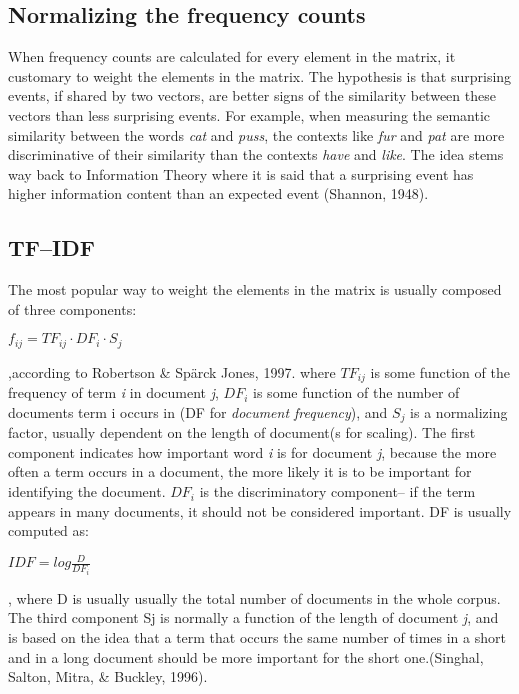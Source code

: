 \subsection{Normalizing the frequency counts}
When frequency counts are calculated for every element in the matrix, it customary to weight the elements in the matrix. The hypothesis is that surprising events, if shared by two vectors, are better signs of the similarity between these vectors than less surprising events. For example, when measuring the semantic similarity between the words \textit{cat} and \textit{puss}, the contexts like \textit{fur} and \textit{pat} are more discriminative of their similarity than the contexts \textit{have} and \textit{like}. The idea stems way back to Information Theory where it is said that a surprising event has higher information content than an expected event (Shannon, 1948)\cite{shannon1948}.
\subsection{TF--IDF}
The most popular way to weight the elements in the matrix is usually composed of three components:
\begin{center}
\large{
$f_{ij} = TF_{ij} \cdot DF_{i} \cdot S_{j}$
}
\end{center}
,according to Robertson \& Sp\"{a}rck Jones, 1997. \cite{robertson_jones1997} where $TF_{ij}$  is some function of the frequency of term \textit{i} in document \textit{j}, $DF_{i}$ is some function of the number of documents term i occurs in (DF for \textit{document frequency}), and $S_{j}$ is a normalizing factor, usually dependent on the length of document(s for scaling).
The first component indicates how important word \textit{i} is for document \textit{j}, because the more often a term occurs in a document, the more likely it is to be important for identifying the document. $DF_{i}$ is the discriminatory component-- if the term appears in many documents, it should not be considered important. DF is usually computed as:
\begin{center}\large{
$IDF = log \frac{D}{DF_{i}}$
}
\end{center}
, where D is usually usually the total number of documents in the whole corpus. The third component Sj 
is normally a function of the length of document \textit{j}, and is based on the idea that a term that 
occurs the same number of times in a short and in a long document should be more important for the 
short one.(Singhal, Salton, Mitra, \& Buckley, 1996)\cite{journals/ipm/SinghalSMB96}. 


